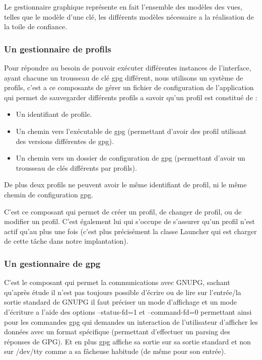 \documentclass{../res/univ-projet}
\begin{document}
      Le gestionnaire graphique représente en fait l'ensemble des modèles des vues,
      telles que le modèle d'une clé, les différents modèles nécessaire a la réalisation
      de la toile de confiance.

    \subsubsection{Un gestionnaire de profils}

      Pour répondre au besoin de pouvoir exécuter différentes instances de l'interface, ayant chacune
      un trousseau de clé gpg différent, nous utilisons un système de profils, c'est a ce composants
      de gérer un fichier de configuration de l'application qui permet de sauvegarder différents
      profils a savoir qu'un profil est constitué de :
      \begin{itemize}
        \item Un identifiant de profile.
        \item Un chemin vers l'exécutable de gpg (permettant d'avoir des profil utilisant des versions différentes de gpg).
        \item Un chemin vers un dossier de configuration de gpg (permettant d'avoir un trousseau de clés différents par profils).
      \end{itemize}
      De plus deux profils ne peuvent avoir le même identifiant de profil,
      ni le même chemin de configuration gpg.

      C'est ce composant qui permet de créer un profil, de changer de profil, ou de modifier un profil.
      C'est également lui qui s'occupe de s'assurer qu'un profil n'est actif qu'au plus une fois
      (c'est plus précisément la classe Launcher qui est charger de cette tâche dans notre implantation).

    \subsubsection{Un gestionnaire de gpg}

      C'est le composant qui permet la communications avec GNUPG,
      sachant qu'après étude il n'est pas toujours possible d'écrire ou de lire sur l'entrée/la sortie standard de GNUPG
      il faut préciser un mode d'affichage et un mode d'écriture a l'aide des options --status-fd=1 et --command-fd=0
      permettant ainsi pour les commandes gpg qui demandes un interaction de l'utilisateur d'afficher
      les données avec un format spécifique (permettant d'effectuer un parsing des réponses de GPG).
      Et en plus gpg affiche sa sortie sur sa sortie standard et non sur /dev/tty comme a sa fâcheuse habitude (de même pour son entrée).
\end{document}
